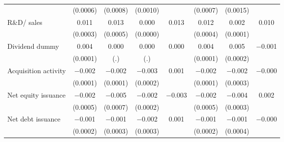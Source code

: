 \begin{tabular}{l*{7}{c}}
                    &    (0.0006)&    (0.0008)&    (0.0010)&            &    (0.0007)&    (0.0015)&            \\
\addlinespace
R\&D/ sales         &       0.011&       0.013&       0.000&       0.013&       0.012&       0.002&       0.010\\
                    &    (0.0003)&    (0.0005)&    (0.0000)&            &    (0.0004)&    (0.0001)&            \\
\addlinespace
Dividend dummy      &       0.004&       0.000&       0.000&       0.000&       0.004&       0.005&    $-$0.001\\
                    &    (0.0001)&         (.)&         (.)&            &    (0.0001)&    (0.0002)&            \\
\addlinespace
Acquisition activity&    $-$0.002&    $-$0.002&    $-$0.003&       0.001&    $-$0.002&    $-$0.002&    $-$0.000\\
                    &    (0.0001)&    (0.0001)&    (0.0002)&            &    (0.0001)&    (0.0003)&            \\
\addlinespace
Net equity issuance &    $-$0.002&    $-$0.005&    $-$0.002&    $-$0.003&    $-$0.002&    $-$0.004&       0.002\\
                    &    (0.0005)&    (0.0007)&    (0.0002)&            &    (0.0005)&    (0.0003)&            \\
\addlinespace
Net debt issuance   &    $-$0.001&    $-$0.001&    $-$0.002&       0.001&    $-$0.001&    $-$0.001&    $-$0.000\\
                    &    (0.0002)&    (0.0003)&    (0.0003)&            &    (0.0002)&    (0.0004)&            \\
\bottomrule
\end{tabular}
